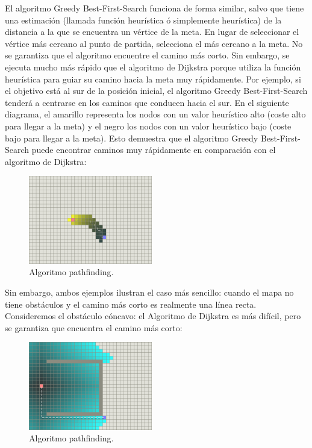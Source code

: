 \documentclass[reprint,amsmath,amssymb,aps]{revtex4-2}
\begin{document}
El algoritmo Greedy Best-First-Search funciona de forma similar, salvo que tiene una estimación (llamada función heurística ó simplemente heurística) de la distancia a la que se encuentra un vértice de la meta. En lugar de seleccionar el vértice más cercano al punto de partida, selecciona el más cercano a la meta. No se garantiza que el algoritmo encuentre el camino más corto. Sin embargo, se ejecuta mucho más rápido que el algoritmo de Dijkstra porque utiliza la función heurística para guiar su camino hacia la meta muy rápidamente. Por ejemplo, si el objetivo está al sur de la posición inicial, el algoritmo Greedy Best-First-Search tenderá a centrarse en los caminos que conducen hacia el sur. En el siguiente diagrama, el amarillo representa los nodos con un valor heurístico alto (coste alto para llegar a la meta) y el negro los nodos con un valor heurístico bajo (coste bajo para llegar a la meta). Esto demuestra que el algoritmo Greedy Best-First-Search puede encontrar caminos muy rápidamente en comparación con el algoritmo de Dijkstra:

\begin{figure}[H]
 	\centering
 	\includegraphics[width=0.48\textwidth]{greedy.png}
 	\caption{Algoritmo pathfinding.}
 	\label{a}
\end{figure}

Sin embargo, ambos ejemplos ilustran el caso más sencillo: cuando el mapa no tiene obstáculos y el camino más corto es realmente una línea recta. Consideremos el obstáculo cóncavo: el Algoritmo de Dijkstra es más difícil, pero se garantiza que encuentra el camino más corto:

\begin{figure}[H]
 	\centering
 	\includegraphics[width=0.48\textwidth]{dijkstra-trap.png}
 	\caption{Algoritmo pathfinding.}
 	\label{dijkstra-trap}
\end{figure}
 
\end{document}
